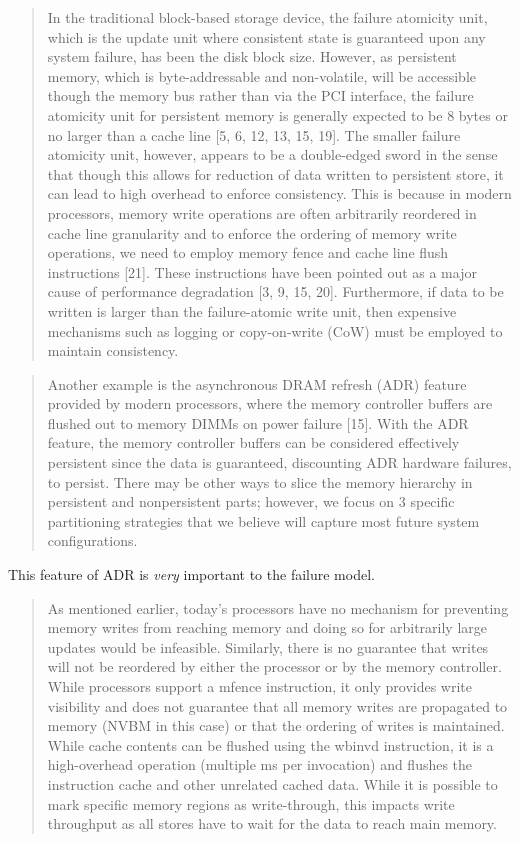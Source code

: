 \begin{quotation}
    In the traditional block-based storage device,
the failure atomicity unit, which is the update unit
where consistent state is guaranteed upon any system
failure, has been the disk block size. However, as persistent
memory, which is byte-addressable and non-volatile,
will be accessible though the memory bus rather than via
the PCI interface, the failure atomicity unit for persistent
memory is generally expected to be 8 bytes or no larger
than a cache line [5, 6, 12, 13, 15, 19].
The smaller failure atomicity unit, however, appears
to be a double-edged sword in the sense that though this
allows for reduction of data written to persistent store,
it can lead to high overhead to enforce consistency. This
is because in modern processors, memory write operations
are often arbitrarily reordered in cache line granularity
and to enforce the ordering of memory write operations,
we need to employ memory fence and cache
line flush instructions [21]. These instructions have been
pointed out as a major cause of performance degradation
[3, 9, 15, 20]. Furthermore, if data to be written is
larger than the failure-atomic write unit, then expensive
mechanisms such as logging or copy-on-write (CoW)
must be employed to maintain consistency.\cite{lee2017wort}
\end{quotation}

\begin{quotation}
    Another example is the
asynchronous DRAM refresh (ADR) feature provided by
modern processors, where the memory controller buffers
are flushed out to memory DIMMs on power failure [15].
With the ADR feature, the memory controller buffers can
be considered effectively persistent since the data is guaranteed,
discounting ADR hardware failures, to persist.
There may be other ways to slice the memory hierarchy
in persistent and nonpersistent parts; however, we focus
on 3 specific partitioning strategies that we believe will
capture most future system configurations.\cite{marathe2018persistent}
\end{quotation}

This feature of ADR is \textit{very} important to the failure model.

\begin{quotation}
    As mentioned earlier, today’s processors have no mechanism
for preventing memory writes from reaching memory
and doing so for arbitrarily large updates would be
infeasible. Similarly, there is no guarantee that writes
will not be reordered by either the processor or by the
memory controller. While processors support a mfence
instruction, it only provides write visibility and does not
guarantee that all memory writes are propagated to memory
(NVBM in this case) or that the ordering of writes is
maintained. While cache contents can be flushed using
the wbinvd instruction, it is a high-overhead operation
(multiple ms per invocation) and flushes the instruction
cache and other unrelated cached data. While it is possible
to mark specific memory regions as write-through,
this impacts write throughput as all stores have to wait
for the data to reach main memory.\cite{venkataraman2011consistent}
\end{quotation}

